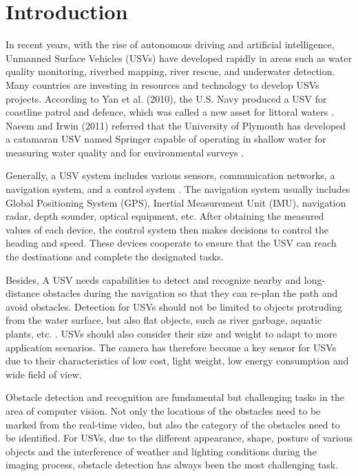 \documentclass[sensors,article,submit,moreauthors,pdftex]{Definitions/mdpi}
\begin{document}

\section{Introduction}

In recent years, with the rise of autonomous driving and artificial intelligence, Unmanned Surface Vehicles (USVs) have developed rapidly in areas such as water quality monitoring, riverbed mapping, river rescue, and underwater detection. Many countries are investing in resources and technology to develop USVs projects. According to Yan et al. (2010), the U.S. Navy produced a USV for coastline patrol and defence, which was called a new asset for littoral waters \cite{yan2010development}. Naeem and Irwin (2011) referred that the University of Plymouth has developed a catamaran USV named Springer capable of operating in shallow water for measuring water quality and for environmental surveys \cite{naeem2011evasive}.

Generally, a USV system includes various sensors, communication networks, a navigation system, and a control system \cite{casalino2009three}. The navigation system usually includes Global Positioning System (GPS), Inertial Measurement Unit (IMU), navigation radar, depth sounder, optical equipment, etc. After obtaining the measured values of each device, the control system then makes decisions to control the heading and speed. These devices cooperate to ensure that the USV can reach the destinations and complete the designated tasks.

Besides, A USV needs capabilities to detect and recognize nearby and long-distance obstacles during the navigation so that they can re-plan the path and avoid obstacles. Detection for USVs should not be limited to objects protruding from the water surface, but also flat objects, such as river garbage, aquatic plants, etc. \cite{7073635}. USVs should also consider their size and weight to adapt to more application scenarios. The camera has therefore become a key sensor for USVs due to their characteristics of low cost, light weight, low energy consumption and wide field of view.

Obstacle detection and recognition are fundamental but challenging tasks in the area of computer vision. Not only the locations of the obstacles need to be marked from the real-time video, but also the category of the obstacles need to be identified. For USVs, due to the different appearance, shape, posture of various objects and the interference of weather and lighting conditions during the imaging process, obstacle detection has always been the most challenging task. 
\end{document}
